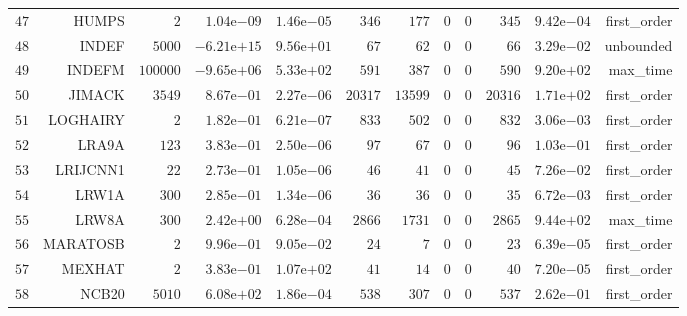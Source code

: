 \begin{longtable}{rrrrrrrrrrrr}
  \(    47\) & HUMPS & \(     2\) & \( 1.04\)e\(-09\) & \( 1.46\)e\(-05\) & \(   346\) & \(   177\) & \(     0\) & \(     0\) & \(   345\) & \( 9.42\)e\(-04\) & first\_order \\
  \(    48\) & INDEF & \(  5000\) & \(-6.21\)e\(+15\) & \( 9.56\)e\(+01\) & \(    67\) & \(    62\) & \(     0\) & \(     0\) & \(    66\) & \( 3.29\)e\(-02\) & unbounded \\
  \(    49\) & INDEFM & \(100000\) & \(-9.65\)e\(+06\) & \( 5.33\)e\(+02\) & \(   591\) & \(   387\) & \(     0\) & \(     0\) & \(   590\) & \( 9.20\)e\(+02\) & max\_time \\
  \(    50\) & JIMACK & \(  3549\) & \( 8.67\)e\(-01\) & \( 2.27\)e\(-06\) & \( 20317\) & \( 13599\) & \(     0\) & \(     0\) & \( 20316\) & \( 1.71\)e\(+02\) & first\_order \\
  \(    51\) & LOGHAIRY & \(     2\) & \( 1.82\)e\(-01\) & \( 6.21\)e\(-07\) & \(   833\) & \(   502\) & \(     0\) & \(     0\) & \(   832\) & \( 3.06\)e\(-03\) & first\_order \\
  \(    52\) & LRA9A & \(   123\) & \( 3.83\)e\(-01\) & \( 2.50\)e\(-06\) & \(    97\) & \(    67\) & \(     0\) & \(     0\) & \(    96\) & \( 1.03\)e\(-01\) & first\_order \\
  \(    53\) & LRIJCNN1 & \(    22\) & \( 2.73\)e\(-01\) & \( 1.05\)e\(-06\) & \(    46\) & \(    41\) & \(     0\) & \(     0\) & \(    45\) & \( 7.26\)e\(-02\) & first\_order \\
  \(    54\) & LRW1A & \(   300\) & \( 2.85\)e\(-01\) & \( 1.34\)e\(-06\) & \(    36\) & \(    36\) & \(     0\) & \(     0\) & \(    35\) & \( 6.72\)e\(-03\) & first\_order \\
  \(    55\) & LRW8A & \(   300\) & \( 2.42\)e\(+00\) & \( 6.28\)e\(-04\) & \(  2866\) & \(  1731\) & \(     0\) & \(     0\) & \(  2865\) & \( 9.44\)e\(+02\) & max\_time \\
  \(    56\) & MARATOSB & \(     2\) & \( 9.96\)e\(-01\) & \( 9.05\)e\(-02\) & \(    24\) & \(     7\) & \(     0\) & \(     0\) & \(    23\) & \( 6.39\)e\(-05\) & first\_order \\
  \(    57\) & MEXHAT & \(     2\) & \( 3.83\)e\(-01\) & \( 1.07\)e\(+02\) & \(    41\) & \(    14\) & \(     0\) & \(     0\) & \(    40\) & \( 7.20\)e\(-05\) & first\_order \\
  \(    58\) & NCB20 & \(  5010\) & \( 6.08\)e\(+02\) & \( 1.86\)e\(-04\) & \(   538\) & \(   307\) & \(     0\) & \(     0\) & \(   537\) & \( 2.62\)e\(-01\) & first\_order \\

\end{longtable}
